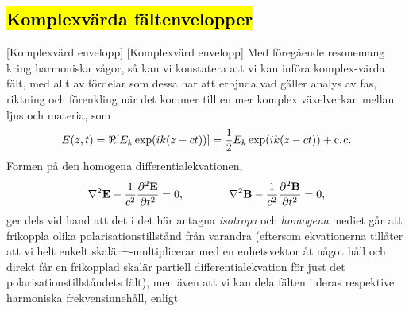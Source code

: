 {{{{{\subsection{{\hl{Komplexv{\"a}rda f{\"a}ltenvelopper}}}
[Komplexv{\"a}rd envelopp]
[Komplexv{\"a}rd envelopp]
Med f{\"o}reg{\aa}ende resonemang kring harmoniska v{\aa}gor, s{\aa} kan vi
konstatera att vi kan inf{\"o}ra komplex-v{\"a}rda f{\"a}lt, med allt av
f{\"o}rdelar som dessa har att erbjuda vad g{\"a}ller analys av fas, riktning
och f{\"o}renkling n{\"a}r det kommer till en mer komplex v{\"a}xelverkan
mellan ljus och materia, som
{\hl{$$
  E(z,t)=\Re[E_k\exp(ik(z-ct))]
    ={{1}\over{2}}E_k\exp(ik(z-ct))+\hbox{c.\kern1ptc.}
$$}}
Formen p{\aa} den homogena differentialekvationen,
\hl{$$
  \nabla^2{\bf E} - {{1}\over{c^2}} %
    {{\partial^2{\bf E}}\over{\partial t^2}} = 0,
  \qquad\qquad
  \nabla^2{\bf B} - {{1}\over{c^2}} %
    {{\partial^2{\bf B}}\over{\partial t^2}} = 0,
$$}
ger dels vid hand att det i det h{\"a}r antagna {\it isotropa} och
{\it homogena} mediet g{\aa}r att frikoppla olika polarisationstillst{\aa}nd
fr{\aa}n varandra (eftersom ekvationerna till{\aa}ter att vi helt enkelt
skal{\"a}r±-multipli\-cerar med en enhetsvektor {\aa}t n{\aa}got h{\aa}ll
och direkt f{\aa}r en frikopplad skal{\"a}r partiell differentialekvation
f{\"o}r just det polarisationstillst{\aa}ndets f{\"a}lt), men {\"a}ven att
vi kan dela f{\"a}lten i deras respektive harmoniska frekvensinneh{\aa}ll,
enligt}}}}}
